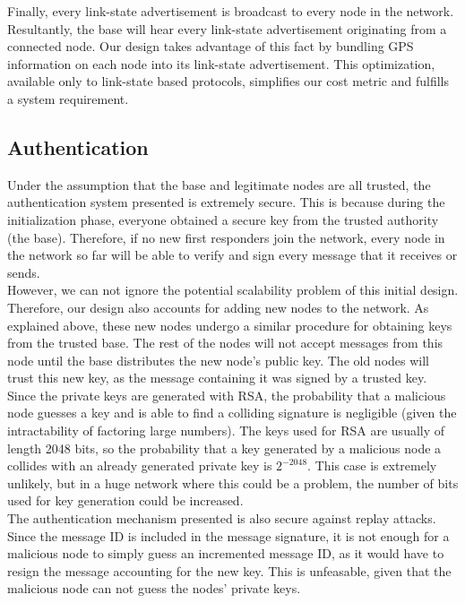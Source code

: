 \documentclass[letterpaper]{article}
\begin{document}
\noindent Finally, every link-state advertisement is broadcast to every node in the network. Resultantly, the base
will hear every link-state advertisement originating from a connected node. Our design takes advantage of this fact by
bundling GPS information on each node into its link-state advertisement. This optimization, available only to link-state
based protocols, simplifies our cost metric and fulfills a system requirement. 

\subsection{Authentication}
Under the assumption that the base and legitimate nodes are all trusted, the authentication system presented is extremely secure. This is because during the initialization phase, everyone obtained a secure key from the trusted authority (the base). Therefore, if no new first responders join the network, every node in the network so far will be able to verify and sign every message that it receives or sends. \\

\noindent However, we can not ignore the potential scalability problem of this initial design. Therefore, our design also accounts for adding new nodes to the network. As explained above, these new nodes undergo a similar procedure for obtaining keys from the trusted base. The rest of the nodes will not accept messages from this node until the base distributes the new node's public key. The old nodes will trust this new key, as the message containing it was signed by a trusted key.
\\

\noindent Since the private keys are generated with RSA, the probability that a malicious node guesses a key and is able to find a colliding signature is negligible (given the intractability of factoring large numbers). The keys used for RSA are usually of length 2048 bits, so the probability that a key generated by a malicious node a collides with an already generated private key is $2^{-2048}$. This case is extremely unlikely, but in a huge network where this could be a problem, the number of bits used for key generation could be increased.\\

\noindent The authentication mechanism presented is also secure against replay attacks. Since the message ID is included in the message signature, it is not enough for a malicious node to simply guess an incremented message ID, as it would have to resign the message accounting for the new key. This is unfeasable, given that the malicious node can not guess the nodes' private keys.
\end{document}
